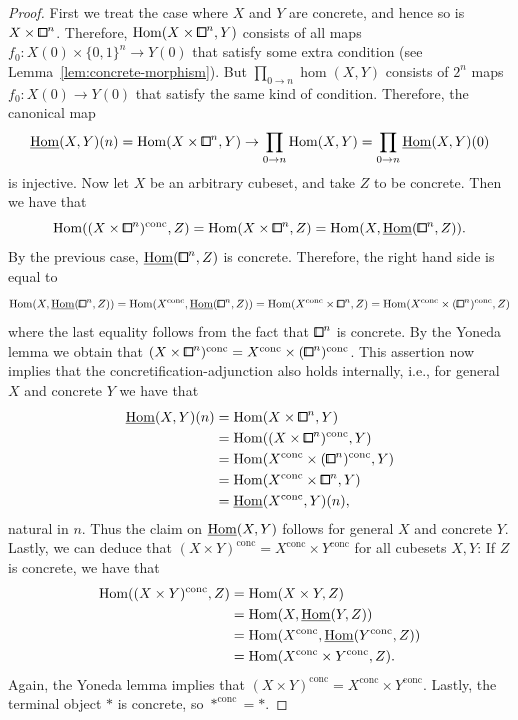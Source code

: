 \begin{proof}
First we treat the case where $X$ and $Y$ are concrete, and hence so is $X\times{\bbox}^n$.
Therefore, $\hom(X\times{\bbox}^n,Y)$ consists of all maps $f_0\colon X(0)\times\{0,1\}^n\to Y(0)$ that satisfy some extra condition (see Lemma~\ref{lem:concrete-morphism}).
But $\prod_{0\to n} \hom(X,Y)$ consists of $2^n$ maps $f_0\colon X(0)\to Y(0)$ that satisfy the same kind of condition.
Therefore, the canonical map
\[
    \ihom(X,Y)(n) = \hom(X\times{\bbox}^n,Y) \to \prod_{0\to n}\hom(X,Y) = \prod_{0\to n}\ihom(X,Y)(0)
\]
is injective.
Now let $X$ be an arbitrary cubeset, and take $Z$ to be concrete.
Then we have that
\[
    \hom((X\times{\bbox}^n)^\mathrm{conc},Z) = \hom(X\times{\bbox}^n,Z) = \hom(X,\ihom({\bbox}^n,Z)).
\]
By the previous case, $\ihom({\bbox}^n,Z)$ is concrete.
Therefore, the right hand side is equal to
\[
    \hom(X,\ihom({\bbox}^n,Z)) = \hom(X^\mathrm{conc},\ihom({\bbox}^n,Z)) = \hom(X^\mathrm{conc}\times{\bbox}^n,Z) = \hom(X^\mathrm{conc}\times({\bbox}^n)^\mathrm{conc},Z)
\]
where the last equality follows from the fact that ${\bbox}^n$ is concrete.
By the Yoneda lemma we obtain that $(X\times{\bbox}^n)^\mathrm{conc} = X^\mathrm{conc}\times({\bbox}^n)^\mathrm{conc}$.
This assertion now implies that the concretification-adjunction also holds internally, i.e.,
for general $X$ and concrete $Y$ we have that
\begin{align*}
    \ihom(X,Y)(n) &= \hom(X\times{\bbox}^n,Y) \\
    &= \hom((X\times{\bbox}^n)^\mathrm{conc},Y) \\
    &= \hom(X^\mathrm{conc}\times({\bbox}^n)^\mathrm{conc},Y) \\
    &= \hom(X^\mathrm{conc}\times{\bbox}^n,Y) \\
    &= \ihom(X^\mathrm{conc},Y)(n),
\end{align*}
natural in $n$.
Thus the claim on $\underline{\operatorname{Hom}}(X,Y)$ follows for general $X$ and concrete $Y$.
Lastly, we can deduce that $(X\times Y)^\mathrm{conc} = X^\mathrm{conc}\times Y^\mathrm{conc}$ for all cubesets $X,Y$:
If $Z$ is concrete, we have that
\begin{align*}
    \operatorname{Hom}((X\times Y)^\mathrm{conc},Z) &= \operatorname{Hom}(X\times Y,Z) \\
    &= \operatorname{Hom}(X,\underline{\operatorname{Hom}}(Y,Z)) \\
    &= \operatorname{Hom}(X^\mathrm{conc},\underline{\operatorname{Hom}}(Y^\mathrm{conc},Z)) \\
    &= \operatorname{Hom}(X^\mathrm{conc}\times Y^\mathrm{conc},Z).
\end{align*}
Again, the Yoneda lemma implies that $(X\times Y)^\mathrm{conc} = X^\mathrm{conc}\times Y^\mathrm{conc}$.
Lastly, the terminal object $\ast$ is concrete, so $\ast^\mathrm{conc}=\ast$.
\end{proof}

